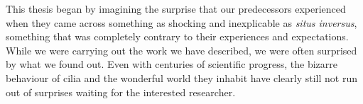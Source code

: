 This thesis began by imagining the surprise that our predecessors experienced when they came across something as shocking and inexplicable as \textit{situs inversus}, something that was completely contrary to their experiences and expectations. While we were carrying out the work we have described, we were often surprised by what we found out. Even with centuries of scientific progress, the bizarre behaviour of cilia and the wonderful world they inhabit have clearly still not run out of surprises waiting for the interested researcher.














